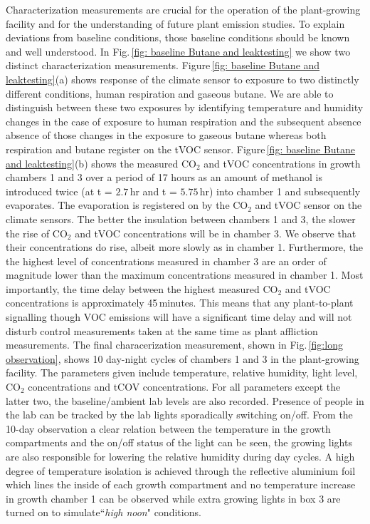 \documentclass[reprint,superscriptaddress,aps,amsmath,amssymb]{revtex4-1}
\begin{document}
Characterization measurements are crucial for the operation of the plant-growing facility and for the understanding of future plant emission studies. To explain deviations from baseline conditions, those baseline conditions should be known and well understood. In Fig.\,\ref{fig: baseline Butane and leaktesting} we show two distinct characterization measurements. Figure\,\ref{fig: baseline Butane and leaktesting}(a) shows response of the climate sensor to exposure to two  distinctly different conditions, human respiration and gaseous butane. We are able to distinguish between these two exposures by identifying temperature and humidity changes in the case of exposure to human respiration and the subsequent absence absence of those changes in the exposure to gaseous butane whereas both respiration and butane register on the tVOC sensor. Figure\,\ref{fig: baseline Butane and leaktesting}(b) shows the measured CO$_2$ and tVOC concentrations in growth chambers 1 and 3 over a period of 17 hours as an amount of methanol is introduced twice (at t = $2.7$\,hr and t = $5.75$\,hr) into chamber 1 and subsequently evaporates. The evaporation is registered on by the CO$_2$ and tVOC sensor on the climate sensors. The better the insulation between chambers 1 and 3, the slower the rise of CO$_2$ and tVOC concentrations will be in chamber 3. We observe that their concentrations do rise, albeit more slowly as in chamber 1. Furthermore, the the highest level of  concentrations measured in chamber 3 are an order of magnitude lower than the maximum concentrations measured in chamber 1. Most importantly, the time delay between the highest measured CO$_2$ and tVOC concentrations is approximately 45\,minutes. This means that any plant-to-plant signalling though VOC emissions will have a significant time delay and will not disturb control measurements taken at the same time as plant affliction measurements.  
The final characerization measurement, shown in Fig.\,\ref{fig:long observation}, shows 10 day-night cycles of chambers 1 and 3 in the plant-growing facility. The parameters given include temperature, relative humidity, light level, CO$_2$ concentrations and tCOV concentrations. For all parameters except the latter two, the baseline/ambient lab levels are also recorded. Presence of people in the lab can be tracked by the lab lights sporadically switching on/off. From the 10-day observation a clear relation between the temperature in the growth compartments and the on/off status of the light can be seen, the growing lights are also responsible for lowering the relative humidity during day cycles. A high degree of temperature isolation is achieved through the reflective aluminium foil which lines the inside of each growth compartment and no temperature increase in growth chamber 1 can be observed while extra growing lights in box 3 are turned on to simulate``\textit{high noon}" conditions. 
\end{document}
